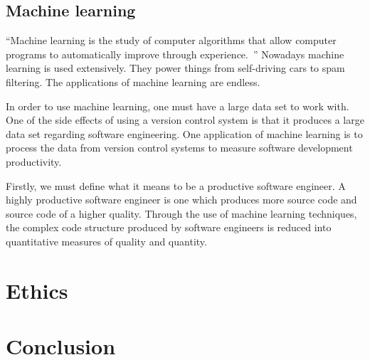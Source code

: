 \documentclass{article}
\begin{document}
\subsection{Machine learning}
``Machine learning is the study of computer algorithms that allow computer
programs to automatically improve through
experience.~\cite{machine1997learning}'' Nowadays machine learning is used
extensively. They power things from self-driving cars to spam filtering. The
applications of machine learning are endless.

In order to use machine learning, one must have a large data set to work with.
One of the side effects of using a version control system is that it produces a
large data set regarding software engineering. One application of machine
learning is to process the data from version control systems to measure
software development productivity.

Firstly, we must define what it means to be a productive software engineer. A
highly productive software engineer is one which produces more source code and
source code of a higher quality. Through the use of machine learning
techniques, the complex code structure produced by software engineers is
reduced into quantitative measures of quality and
quantity.~\cite{helie2018measuring}

\section{Ethics}

\section{Conclusion}

\newpage



\end{document}
